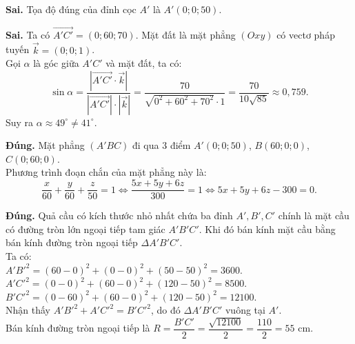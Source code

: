 \begin{ex}
{		\begin{itemchoice}
			\itemch \textbf{Sai.} Tọa độ đúng của đỉnh cọc $A'$ là $A'(0;0;50)$.
			
			\itemch \textbf{Sai.} Ta có $\vec{A'C'} = (0; 60; 70)$. Mặt đất là mặt phẳng $(Oxy)$ có vectơ pháp tuyến $\vec{k} = (0;0;1)$.
			\\ Gọi $\alpha$ là góc giữa $A'C'$ và mặt đất, ta có:
			\[ \sin \alpha = \dfrac{|\vec{A'C'} \cdot \vec{k}|}{|\vec{A'C'}| \cdot |\vec{k}|} = \dfrac{70}{\sqrt{0^2+60^2+70^2} \cdot 1} = \dfrac{70}{10\sqrt{85}} \approx 0,759. \]
			Suy ra $\alpha \approx 49^\circ \neq 41^\circ$.
			
			\itemch \textbf{Đúng.} Mặt phẳng $(A'BC)$ đi qua $3$ điểm $A'(0;0;50)$, $B(60;0;0)$, $C(0;60;0)$.
			\\ Phương trình đoạn chắn của mặt phẳng này là:
			\[ \dfrac{x}{60} + \dfrac{y}{60} + \dfrac{z}{50} = 1 \Leftrightarrow \dfrac{5x + 5y + 6z}{300} = 1 \Leftrightarrow 5x + 5y + 6z - 300 = 0. \]
			
			\itemch \textbf{Đúng.} Quả cầu có kích thước nhỏ nhất chứa ba đỉnh $A', B', C'$ chính là mặt cầu có đường tròn lớn ngoại tiếp tam giác $A'B'C'$. Khi đó bán kính mặt cầu bằng bán kính đường tròn ngoại tiếp $\Delta A'B'C'$.
			\\ Ta có:
			\\ $A'B'^2 = (60-0)^2 + (0-0)^2 + (50-50)^2 = 3600$.
			\\ $A'C'^2 = (0-0)^2 + (60-0)^2 + (120-50)^2 = 8500$.
			\\ $B'C'^2 = (0-60)^2 + (60-0)^2 + (120-50)^2 = 12100$.
			\\ Nhận thấy $A'B'^2 + A'C'^2 = B'C'^2$, do đó $\Delta A'B'C'$ vuông tại $A'$.
			\\ Bán kính đường tròn ngoại tiếp là $R = \dfrac{B'C'}{2} = \dfrac{\sqrt{12100}}{2} = \dfrac{110}{2} = 55\text{ cm}$.
		\end{itemchoice}
	}
\end{ex}

